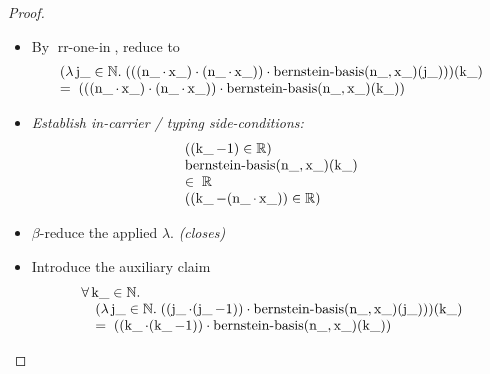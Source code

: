 \documentclass[11pt]{article}
\theoremstyle{plain}
\begin{document}
\begin{proof}
\begin{itemize}[leftmargin=2.8em, itemsep=4pt, parsep=1pt]
  \item[\textbf{114}] By $\operatorname{rr\text{-}one\text{-}in}$, reduce to
\begin{equation*}
\begin{array}{@{}l@{}} (\lambda \operatorname{j\_} \in \mathbb{N}.\; (((\operatorname{n\_} \cdot \operatorname{x\_}) \cdot (\operatorname{n\_} \cdot \operatorname{x\_})) \cdot \operatorname{bernstein\text{-}basis}(\operatorname{n\_}, \operatorname{x\_})(\operatorname{j\_})))(\operatorname{k\_}) \\ =\; (((\operatorname{n\_} \cdot \operatorname{x\_}) \cdot (\operatorname{n\_} \cdot \operatorname{x\_})) \cdot \operatorname{bernstein\text{-}basis}(\operatorname{n\_}, \operatorname{x\_})(\operatorname{k\_})) \end{array}
\end{equation*}

  \item[\textbf{115--117}] \emph{Establish in-carrier / typing side-conditions:}
\begin{equation*}
\begin{array}{@{}l@{}}
((\operatorname{k\_} - 1) \in \mathbb{R}) \\
\begin{array}{@{}l@{}} \operatorname{bernstein\text{-}basis}(\operatorname{n\_}, \operatorname{x\_})(\operatorname{k\_}) \\ \in\; \mathbb{R} \end{array} \\
((\operatorname{k\_} - (\operatorname{n\_} \cdot \operatorname{x\_})) \in \mathbb{R})
\end{array}
\end{equation*}

  \item[\textbf{118--119}] $\beta$-reduce the applied $\lambda$.  \emph{(closes)}
  \item[\textbf{120}] Introduce the auxiliary claim
\begin{equation*}
\begin{array}{@{}l@{}} \forall \operatorname{k\_} \in \mathbb{N}. \\ \quad (\lambda \operatorname{j\_} \in \mathbb{N}.\; ((\operatorname{j\_} \cdot (\operatorname{j\_} - 1)) \cdot \operatorname{bernstein\text{-}basis}(\operatorname{n\_}, \operatorname{x\_})(\operatorname{j\_})))(\operatorname{k\_}) \\ \quad =\; ((\operatorname{k\_} \cdot (\operatorname{k\_} - 1)) \cdot \operatorname{bernstein\text{-}basis}(\operatorname{n\_}, \operatorname{x\_})(\operatorname{k\_})) \end{array}
\end{equation*}


\end{itemize}
\end{proof}
\end{document}
